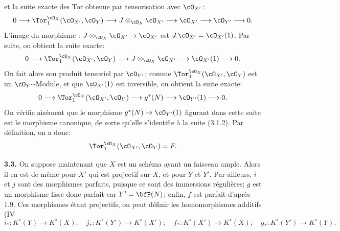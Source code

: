et la
suite exacte des Tor obtenue par tensorisation avec \(\cO_{X'}\):
\[
0\longrightarrow
\Tor_1^{\cO_X}(\cO_{X'},\cO_Y)
\longrightarrow
J\otimes_{\cO_X}\cO_{X'}
\longrightarrow
\cO_{X'}
\longrightarrow
\cO_{Y'}
\longrightarrow0.
\]
L'image du morphisme : \(J\otimes_{\cO_X}\cO_{X'}\to\cO_{X'}\) est
\(J.\cO_{X'}=\cO_{X'}(1)\). Par suite, on obtient la suite exacte:
\[
0\longrightarrow
\Tor_1^{\cO_X}(\cO_{X'},\cO_Y)
\longrightarrow
J\otimes_{\cO_X}\cO_{X'}
\longrightarrow
\cO_{X'}(1)
\longrightarrow0.
\]
On fait alors son produit tensoriel par \(\cO_{Y'}\); comme
\(\Tor_1^{\cO_X}(\cO_{X'},\cO_Y)\) est un \(\cO_{Y'}\)-Module, et que
\(\cO_{X'}(1)\) est inversible, on obtient la suite exacte:
\[
0\longrightarrow
\Tor_1^{\cO_X}(\cO_{X'},\cO_Y)
\longrightarrow
g^*(N)
\longrightarrow
\cO_{Y'}(1)
\longrightarrow0.
\]
On vérifie aisément que le morphisme \(g^*(N)\to\cO_{Y'}(1)\) figurant dans cette suite est le morphisme canonique, de sorte qu'elle s'identifie à la suite (3.1.2). Par définition, on a donc:
\[
\Tor_1^{\cO_X}(\cO_{X'},\cO_Y)=F.
\]

\textbf{3.3.} On suppose maintenant que \(X\) est un schéma ayant un faisceau ample. Alors il en est de même pour \(X'\) qui est projectif sur \(X\), et pour \(Y\) et \(Y'\). Par ailleurs, \(i\) et \(j\) sont des morphismes parfaits, puisque ce sont des immersions régulières; \(g\) est un morphisme lisse donc parfait car \(Y'=\bfP(N)\); enfin, \(f\) est parfait d'après 1.9. Ces morphismes étant projectifs, on peut définir les homomorphismes additifs (IV
\[
i_*:K^\circ(Y)\to K^\circ(X);\quad
j_*:K^\circ(Y')\to K^\circ(X');\quad
f_*:K^\circ(X')\to K^\circ(X);\quad
g_*:K^\circ(Y')\to K^\circ(Y).
\]

